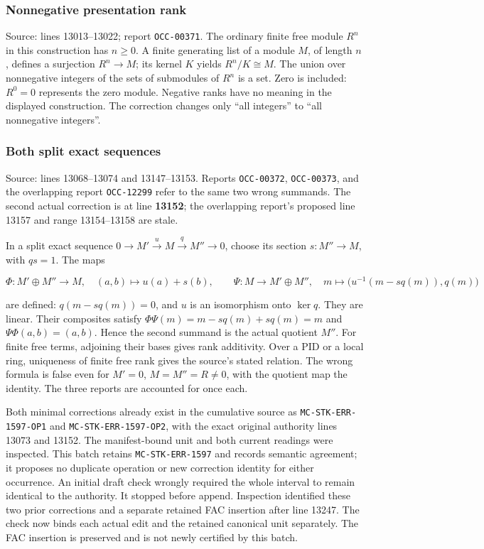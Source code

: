 \subsubsection{Nonnegative presentation rank}\label{nonnegative-presentation-rank}

Source: lines 13013--13022; report \texttt{OCC-00371}. The ordinary finite free module \(R^n\) in this construction has \(n\geq0\). A finite generating list of a module \(M\), of length \(n\), defines a surjection \(R^n\to M\); its kernel \(K\) yields \(R^n/K\cong M\). The union over nonnegative integers of the sets of submodules of \(R^n\) is a set. Zero is included: \(R^0=0\) represents the zero module. Negative ranks have no meaning in the displayed construction. The correction changes only ``all integers'' to ``all nonnegative integers''.

\subsubsection{Both split exact sequences}\label{both-split-exact-sequences}

Source: lines 13068--13074 and 13147--13153. Reports \texttt{OCC-00372}, \texttt{OCC-00373}, and the overlapping report \texttt{OCC-12299} refer to the same two wrong summands. The second actual correction is at line \textbf{13152}; the overlapping report's proposed line 13157 and range 13154--13158 are stale.

In a split exact sequence \(0\to M'\xrightarrow{u}M\xrightarrow{q}M''\to0\), choose its section \(s:M''\to M\), with \(qs=1\). The maps

\[
\Phi:M'\oplus M''\to M,\quad (a,b)\mapsto u(a)+s(b),
\qquad
\Psi:M\to M'\oplus M'',\quad
m\mapsto\bigl(u^{-1}(m-sq(m)),q(m)\bigr)
\]

are defined: \(q(m-sq(m))=0\), and \(u\) is an isomorphism onto \(\ker q\). They are linear. Their composites satisfy \(\Phi\Psi(m)=m-sq(m)+sq(m)=m\) and \(\Psi\Phi(a,b)=(a,b)\). Hence the second summand is the actual quotient \(M''\). For finite free terms, adjoining their bases gives rank additivity. Over a PID or a local ring, uniqueness of finite free rank gives the source's stated relation. The wrong formula is false even for \(M'=0\), \(M=M''=R\ne0\), with the quotient map the identity. The three reports are accounted for once each.

Both minimal corrections already exist in the cumulative source as \texttt{MC-STK-ERR-1597-OP1} and \texttt{MC-STK-ERR-1597-OP2}, with the exact original authority lines 13073 and 13152. The manifest-bound unit and both current readings were inspected. This batch retains \texttt{MC-STK-ERR-1597} and records semantic agreement; it proposes no duplicate operation or new correction identity for either occurrence. An initial draft check wrongly required the whole interval to remain identical to the authority. It stopped before append. Inspection identified these two prior corrections and a separate retained FAC insertion after line 13247. The check now binds each actual edit and the retained canonical unit separately. The FAC insertion is preserved and is not newly certified by this batch.

